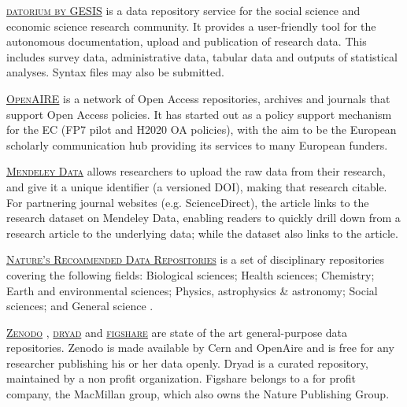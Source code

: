 \vspace{0.4cm}

\noindent {}  \textsc{\href{http://datorium.gesis.org}{datorium by GESIS}} is a data repository service for the social science and economic science research community. It provides a user-friendly tool for the autonomous documentation, upload and publication of research data. This includes survey data, administrative data, tabular data and outputs of statistical analyses. Syntax files may also be submitted. 

\vspace{0.4cm}

\noindent {}  \textsc{\href{http://www.openaire.eu}{OpenAIRE}} is a network of Open Access repositories, archives and journals that support Open Access policies. It has started out as a policy support mechanism for the EC (FP7 pilot and H2020 OA policies), with the aim to be the European scholarly communication hub providing its services to many European funders.

\vspace{0.4cm}

\noindent {}  \textsc{\href{http://data.mendeley.com}{Mendeley Data}} allows researchers to upload the raw data from their research, and give it a unique identifier (a versioned DOI), making that research citable. For partnering journal websites (e.g. ScienceDirect), the article links to the research dataset on Mendeley Data, enabling readers to quickly drill down from a research article to the underlying data; while the dataset also links to the article.

\vspace{0.4cm}

\noindent {}  \textsc{\href{http://www.nature.com/sdata/data-policies/repositories}{Nature's Recommended Data Repositories}} is a set of disciplinary repositories covering the following fields: Biological sciences; Health sciences; Chemistry; Earth and environmental sciences; Physics, astrophysics \& astronomy; Social sciences; and General science \cite{nature_publishing_group_recommended_2014}.

\vspace{0.4cm}

\noindent {} \textsc{\href{http://zenodo.org}{Zenodo}} \cite{zenodo_zenodo_2015},  \textsc{\href{http://datadryad.org/}{dryad}} \cite{dryad_dryad_2015}  and  \textsc{\href{http://figshare.com/}{figshare}} \cite{figshare_figshare_2015} are state of the art general-purpose data repositories. Zenodo is made available by Cern and OpenAire and is free for any researcher publishing his or her data openly. Dryad is a curated repository, maintained by a non profit organization. Figshare belongs to a for profit company, the MacMillan group, which also owns the Nature Publishing Group.


